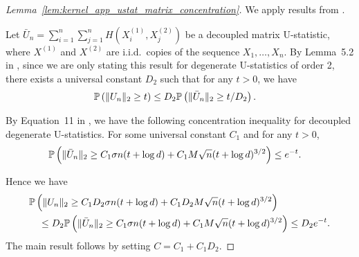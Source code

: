 \begin{proof}[Lemma~\ref{lem:kernel_app_ustat_matrix_concentration}]

  We apply results from \citet{minsker2019moment}.


  Let $\bar U_n = \sum_{i=1}^n \sum_{j=1}^n H(X_i^{(1)}, X_j^{(2)})$
  be a decoupled matrix U-statistic,
  where $X^{(1)}$ and $X^{(2)}$
  are i.i.d.\ copies of the sequence $X_1, \ldots, X_n$.
  By Lemma~5.2 in \citet{minsker2019moment},
  since we are only stating this result for
  degenerate U-statistics of order 2,
  there exists a universal constant $D_2$
  such that for any $t > 0$,
  we have
  \begin{align*}
    \P\left(
      \|U_n\|_2 \geq t
    \right)
    &\leq
    D_2
    \P\left(
      \|\bar U_n\|_2 \geq t / D_2
    \right).
  \end{align*}


  By Equation~11 in \citet{minsker2019moment},
  we have the following concentration inequality
  for decoupled degenerate U-statistics.
  For some universal constant $C_1$
  and for any $t > 0$,
  \begin{align*}
    \P\left(
      \|\bar U_n\|_2
      \geq
      C_1 \sigma n (t + \log d)
      + C_1 M \sqrt{n} (t + \log d)^{3/2}
    \right)
    &\leq
    e^{-t}.
  \end{align*}


  Hence we have
  \begin{align*}
    &\P\left(
      \|U_n\|_2
      \geq
      C_1 D_2 \sigma n (t + \log d)
      + C_1 D_2 M \sqrt{n} (t + \log d)^{3/2}
    \right) \\
    &\quad\leq
    D_2 \P\left(
      \|\bar U_n\|_2
      \geq
      C_1 \sigma n (t + \log d)
      + C_1 M \sqrt{n} (t + \log d)^{3/2}
    \right)
    \leq
    D_2 e^{-t}.
  \end{align*}
  The main result follows by setting
  $C = C_1 + C_1 D_2$.



\end{proof}
